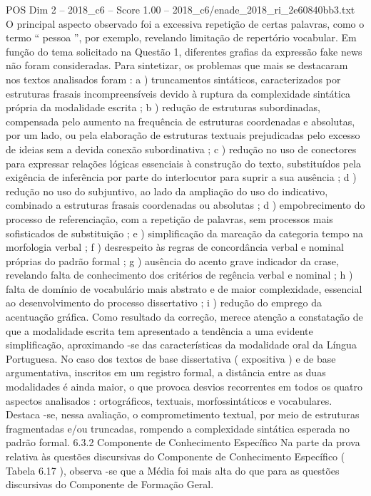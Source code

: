 \begin{textsample}{POS Dim 2 – 2018\_c6 – Score 1.00 – 2018\_c6/enade\_2018\_ri\_2e60840bb3.txt}
O principal aspecto observado foi a excessiva repetição de certas palavras, como o termo “ pessoa ”, por exemplo, revelando limitação de repertório vocabular.
Em função do tema solicitado na Questão 1, diferentes grafias da expressão fake news não foram consideradas.
Para sintetizar, os problemas que mais se destacaram nos textos analisados foram : a ) truncamentos sintáticos, caracterizados por estruturas frasais incompreensíveis devido à ruptura da complexidade sintática própria da modalidade escrita ; b ) redução de estruturas subordinadas, compensada pelo aumento na frequência de estruturas coordenadas e absolutas, por um lado, ou pela elaboração de estruturas textuais prejudicadas pelo excesso de ideias sem a devida conexão subordinativa ; c ) redução no uso de conectores para expressar relações lógicas essenciais à construção do texto, substituídos pela exigência de inferência por parte do interlocutor para suprir a sua ausência ; d ) redução no uso do subjuntivo, ao lado da ampliação do uso do indicativo, combinado a estruturas frasais coordenadas ou absolutas ; d ) empobrecimento do processo de referenciação, com a repetição de palavras, sem processos mais sofisticados de substituição ; e ) simplificação da marcação da categoria tempo na morfologia verbal ; f ) desrespeito às regras de concordância verbal e nominal próprias do padrão formal ; g ) ausência do acento grave indicador da crase, revelando falta de conhecimento dos critérios de regência verbal e nominal ; h ) falta de domínio de vocabulário mais abstrato e de maior complexidade, essencial ao desenvolvimento do processo dissertativo ; i ) redução do emprego da acentuação gráfica.
Como resultado da correção, merece atenção a constatação de que a modalidade escrita tem apresentado a tendência a uma evidente simplificação, aproximando -se das características da modalidade oral da Língua Portuguesa.
No caso dos textos de base dissertativa ( expositiva ) e de base argumentativa, inscritos em um registro formal, a distância entre as duas modalidades é ainda maior, o que provoca desvios recorrentes em todos os quatro aspectos analisados : ortográficos, textuais, morfossintáticos e vocabulares.
Destaca -se, nessa avaliação, o comprometimento textual, por meio de estruturas fragmentadas e/ou truncadas, rompendo a complexidade sintática esperada no padrão formal. 6.3.2 Componente de Conhecimento Específico Na parte da prova relativa às questões discursivas do Componente de Conhecimento Específico ( Tabela 6.17 ), observa -se que a Média foi mais alta do que para as questões discursivas do Componente de Formação Geral.

\end{textsample}
